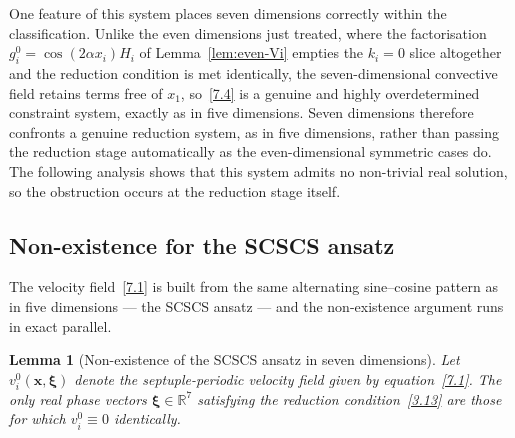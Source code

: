 \documentclass[11pt]{jfm}
\newtheorem{lemma}{Lemma}[section]
\numberwithin{equation}{section}
\begin{document}
One feature of this system places seven dimensions correctly within the classification. Unlike
the even dimensions just treated, where the factorisation $g_i^0=\cos(2\alpha x_i)H_i$ of
Lemma~\ref{lem:even-Vi} empties the $k_i=0$ slice altogether and the reduction condition is met
identically, the seven-dimensional convective field retains terms free of $x_1$, so~\eqref{7.4}
is a genuine and highly overdetermined constraint system, exactly as in five dimensions. Seven
dimensions therefore confronts a genuine reduction system, as in five dimensions, rather than
passing the reduction stage automatically as the even-dimensional symmetric cases do. The
following analysis shows that this system admits no non-trivial real solution, so the obstruction
occurs at the reduction stage itself.

\subsection{Non-existence for the SCSCS ansatz}
The velocity field~\eqref{7.1} is built from the same alternating sine--cosine pattern as in
five dimensions --- the SCSCS ansatz --- and the non-existence argument runs in exact parallel.
\begin{lemma}[Non-existence of the SCSCS ansatz in seven dimensions]
\label{lem:7D_SCSCS}
Let $v_i^0(\boldsymbol{x}, \boldsymbol{\xi})$ denote the septuple-periodic velocity field given
by equation~\eqref{7.1}. The only real phase vectors $\boldsymbol{\xi}\in\mathbb{R}^7$ satisfying
the reduction condition~\eqref{3.13} are those for which $v_i^0 \equiv 0$ identically.
\end{lemma}
\end{document}
